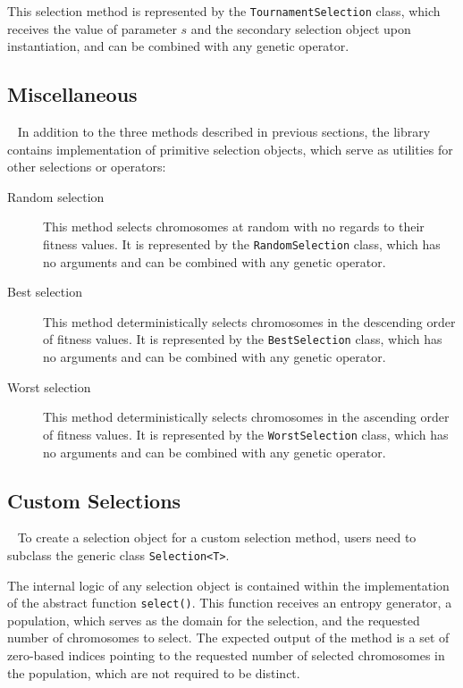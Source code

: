 This selection method is represented by the \texttt{TournamentSelection} class, which receives the value of parameter $s$ and the secondary selection object upon instantiation, and can be combined with any genetic operator.

\subsection{Miscellaneous}~\label{section:miscellaneous}
In addition to the three methods described in previous sections, the library contains implementation of primitive selection objects, which serve as utilities for other selections or operators:
~
\begin{description}
	\item[Random selection]
	This method selects chromosomes at random with no regards to their fitness values. It is represented by the \texttt{RandomSelection} class, which has no arguments and can be combined with any genetic operator.

	\item[Best selection]
	This method deterministically selects chromosomes in the descending order of fitness values. It is represented by the \texttt{BestSelection} class, which has no arguments and can be combined with any genetic operator.

	\item[Worst selection]	
	This method deterministically selects chromosomes in the ascending order of fitness values. It is represented by the \texttt{WorstSelection} class, which has no arguments and can be combined with any genetic operator.
\end{description}

\subsection{Custom Selections}~\label{section:custom-selection}
To create a selection object for a custom selection method, users need to subclass the generic class \texttt{Selection<T>}.

The internal logic of any selection object is contained within the implementation of the abstract function \texttt{select()}. This function receives an entropy generator, a population, which serves as the domain for the selection, and the requested number of chromosomes to select. The expected output of the method is a set of zero-based indices pointing to the requested number of selected chromosomes in the population, which are not required to be distinct.

